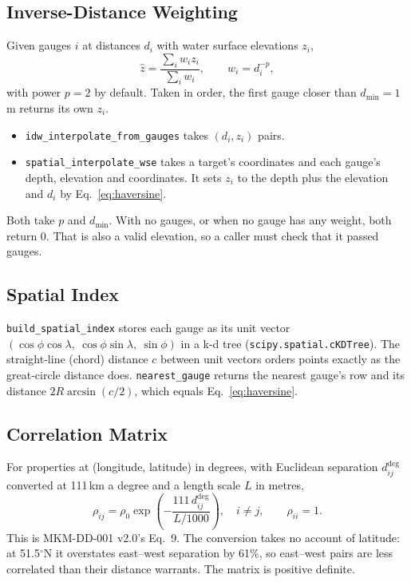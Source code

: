 \documentclass[11pt,a4paper]{article}
\begin{document}
\subsection{Inverse-Distance Weighting}
Given gauges $i$ at distances $d_i$ with water surface elevations $z_i$,
\begin{equation}
    \hat z = \frac{\sum_i w_i z_i}{\sum_i w_i},\qquad w_i = d_i^{-p},
    \label{eq:idw}
\end{equation}
with power $p=2$ by default. Taken in order, the first gauge closer than $d_{\min}=1$\,m
returns its own $z_i$.
\begin{itemize}[nosep]
    \item \texttt{idw\_interpolate\_from\_gauges} takes $(d_i, z_i)$ pairs.
    \item \texttt{spatial\_interpolate\_wse} takes a target's coordinates and each gauge's
          depth, elevation and coordinates. It sets $z_i$ to the depth plus the elevation and
          $d_i$ by Eq.~\eqref{eq:haversine}.
\end{itemize}
Both take $p$ and $d_{\min}$. With no gauges, or when no gauge has any weight, both return
0. That is also a valid elevation, so a caller must check that it passed gauges.

\subsection{Spatial Index}
\texttt{build\_spatial\_index} stores each gauge as its unit vector
$(\cos\phi\cos\lambda,\ \cos\phi\sin\lambda,\ \sin\phi)$ in a k-d tree
(\texttt{scipy.spatial.cKDTree}). The straight-line (chord) distance $c$ between unit
vectors orders points exactly as the great-circle distance does.
\texttt{nearest\_gauge} returns the nearest gauge's row and its distance $2R\arcsin(c/2)$,
which equals Eq.~\eqref{eq:haversine}.

\subsection{Correlation Matrix}
For properties at (longitude, latitude) in degrees, with Euclidean separation
$d^{\deg}_{ij}$ converted at 111\,km a degree and a length scale $L$ in metres,
\begin{equation}
    \rho_{ij} = \rho_0 \exp\!\left(-\frac{111\, d^{\deg}_{ij}}{L/1000}\right),\quad i\ne j,
    \qquad \rho_{ii}=1.
    \label{eq:corr}
\end{equation}
This is MKM-DD-001 v2.0's Eq.~9. The conversion takes no account of latitude: at
51.5$^\circ$N it overstates east--west separation by 61\%, so east--west pairs are less
correlated than their distance warrants. The matrix is positive definite.
\end{document}
